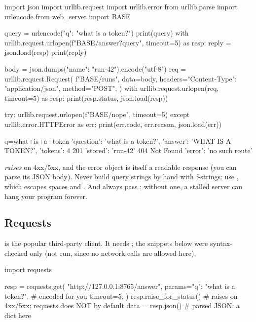 \begin{pycode}
import json
import urllib.request
import urllib.error
from urllib.parse import urlencode
from web_server import BASE

query = urlencode({"q": "what is a token?"})
print(query)
with urllib.request.urlopen(f"{BASE}/answer?{query}", timeout=5) as resp:
    reply = json.load(resp)
print(reply)

body = json.dumps({"name": "run-42"}).encode("utf-8")
req = urllib.request.Request(
    f"{BASE}/runs",
    data=body,
    headers={"Content-Type": "application/json"},
    method="POST",
)
with urllib.request.urlopen(req, timeout=5) as resp:
    print(resp.status, json.load(resp))

try:
    urllib.request.urlopen(f"{BASE}/nope", timeout=5)
except urllib.error.HTTPError as err:
    print(err.code, err.reason, json.load(err))
\end{pycode}
\begin{rawcode}
q=what+is+a+token%
{'question': 'what is a token?', 'answer': 'WHAT IS A TOKEN?', 'tokens': 4}
201 {'stored': 'run-42'}
404 Not Found {'error': 'no such route'}
\end{rawcode}

\begin{trap}
 \emph{raises}  on 4xx/5xx, and the error object is itself a readable
response (you can parse its JSON body). Never build query strings by hand with f-strings: use
, which escapes spaces and . And always pass ; without one, a
stalled server can hang your program forever.
\end{trap}

\subsection{Requests}

 is the popular third-party client. It needs ; the
snippets below were syntax-checked only (not run, since no network calls are allowed here).

\begin{pycode}
import requests

resp = requests.get(
    "http://127.0.0.1:8765/answer",
    params={"q": "what is a token?"},    # encoded for you
    timeout=5,
)
resp.raise_for_status()      # raises on 4xx/5xx; requests does NOT by default
data = resp.json()           # parsed JSON: a dict here
\end{pycode}

